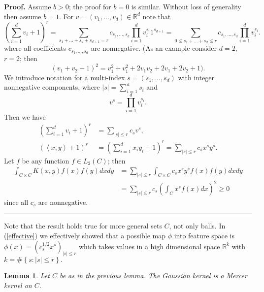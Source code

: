 \documentclass[11pt,twoside]{article}%
\theoremstyle{change}
\newtheorem{lemma}[theorem]{Lemma}
\newenvironment{proof}[1][Proof]{\textbf{#1.} }{\ \rule{0.5em}{0.5em}}
\begin{document}
\begin{proof}
Assume $b>0$; the proof for $b=0$ is similar. Without loss of generality then
assume $b=1$. For $v=(v_{1},\ldots,v_{d})\in\mathbb{R}^{d}$ note that
\[
\left(  \sum_{i=1}^{d}v_{i}+1\right)  ^{r}=\sum_{s_{1}+\ldots+s_{d}+s_{d+1}%
=r}c_{s_{1},\ldots,s_{d}}%
{\displaystyle\prod\limits_{i=1}^{d}}
v_{i}^{s_{i}}1^{s_{d+1}}=\sum_{0\leq s_{1}+\ldots+s_{d}\leq r}c_{s_{1}%
,\ldots,s_{d}}%
{\displaystyle\prod\limits_{i=1}^{d}}
v_{i}^{s_{i}}.
\]
where all coefficients $c_{s_{1},\ldots,s_{d}}$ are nonnegative. (As an
example consider $d=2$, $r=2$; then
\[
\left(  v_{1}+v_{2}+1\right)  ^{2}=v_{1}^{2}+v_{1}^{2}+2v_{1}v_{2}%
+2v_{1}+2v_{2}+1\text{).}%
\]
We introduce notation for a multi-index $s=(s_{1},\ldots,s_{d})$ with integer
nonnegative components, where $\left\vert s\right\vert =\sum_{i=1}^{d}s_{i}$
and
\[
v^{s}=%
{\displaystyle\prod\limits_{i=1}^{d}}
v_{i}^{s_{i}}.
\]
Then we have
\begin{align}
\left(  \sum_{i=1}^{d}v_{i}+1\right)  ^{r}  & =\sum_{\left\vert s\right\vert
\leq r}c_{s}v^{s},\label{effective}\\
\left(  \left\langle x,y\right\rangle +1\right)  ^{r}  & =\left(  \sum
_{i=1}^{d}x_{i}y_{i}+1\right)  ^{r}=\sum_{\left\vert s\right\vert \leq r}%
c_{s}x^{s}y^{s}.\nonumber
\end{align}
Let $f$ be any function $f\in L_{2}(C)$; then
\begin{align*}
\int_{C\times C}K(x,y)f(x)f(y)dxdy  & =\sum_{\left\vert s\right\vert \leq
r}\int_{C\times C}c_{s}x^{s}y^{s}f(x)f(y)dxdy\\
& =\sum_{\left\vert s\right\vert \leq r}c_{s}\left(  \int_{C}x^{s}%
f(x)dx\right)  ^{2}\geq0
\end{align*}
since all $c_{s}$ are nonnegative.
\end{proof}

Note that the result holds true for more general sets $C$, not only balls. In
(\ref{effective}) we effectively showed that a possible map $\phi$ into
feature space is $\phi(x)=\left(  c_{s}^{1/2}x^{s}\right)  _{\left\vert
s\right\vert \leq r}$ which takes values in a high dimensional space
$\mathbb{R}^{k}$ with $k=\#\left\{  s:\left\vert s\right\vert \leq r\right\}
.$ \newpage

\begin{lemma}
\label{lem-gauss-kernel-mercer}Let $C$ be as in the previous lemma. The
Gaussian kernel is a Mercer kernel on $C$.
\end{lemma}
\end{document}
